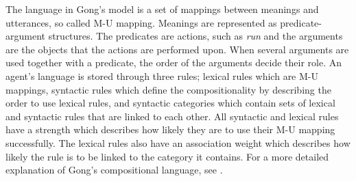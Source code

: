 The language in Gong's model is a set of mappings between meanings and utterances, so called M-U mapping. Meanings are represented as predicate-argument structures. The predicates are actions, such as \textit{run} and the arguments are the objects that the actions are performed upon. When several arguments are used together with a predicate, the order of the arguments decide their role. An agent's language is stored through three rules; lexical rules which are M-U mappings, syntactic rules which define the compositionality by describing the order to use lexical rules, and syntactic categories which contain sets of lexical and syntactic rules that are linked to each other. All syntactic and lexical rules have a strength which describes how likely they are to use their M-U mapping successfully. The lexical rules also have an association weight which describes how likely the rule is to be linked to the category it contains. For a more detailed explanation of Gong's compositional language, see \citep[section 3.2]{gong2011simulating}.
